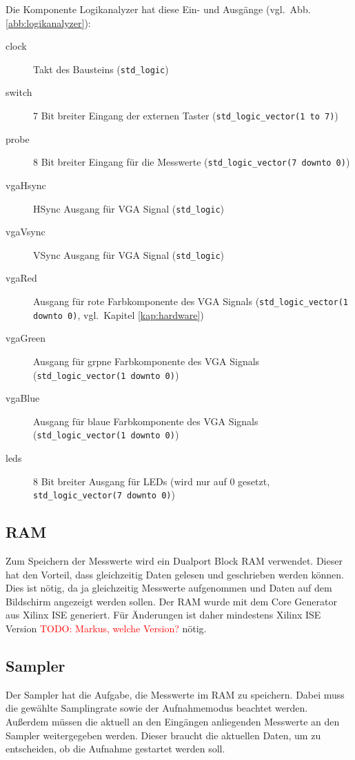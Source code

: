 \documentclass[IN,ngerman,utf8,12pt]{tumbook}
\newcommand\todo[1]{\textcolor{red}{TODO: #1}}
\newcommand{\vgl}{vgl.\ }
\begin{document}
Die Komponente Logikanalyzer hat diese Ein- und Ausgänge (\vgl Abb. \ref{abb:logikanalyzer}):
\begin{description}
    \item[clock] Takt des Bausteins (\texttt{std\_logic})
    \item[switch] 7 Bit breiter Eingang der externen Taster (\texttt{std\_logic\_vector(1 to 7)})
    \item[probe] 8 Bit breiter Eingang für die Messwerte (\texttt{std\_logic\_vector(7 downto 0)})
    \item[vgaHsync] HSync Ausgang für VGA Signal (\texttt{std\_logic})
    \item[vgaVsync] VSync Ausgang für VGA Signal (\texttt{std\_logic})
    \item[vgaRed] Ausgang für rote Farbkomponente des VGA Signals (\texttt{std\_logic\_vector(1 downto 0)}, \vgl Kapitel \ref{kap:hardware})
    \item[vgaGreen] Ausgang für grpne Farbkomponente des VGA Signals (\texttt{std\_logic\_vector(1 downto 0)})
    \item[vgaBlue] Ausgang für blaue Farbkomponente des VGA Signals (\texttt{std\_logic\_vector(1 downto 0)})
    \item[leds] 8 Bit breiter Ausgang für LEDs (wird nur auf 0 gesetzt, \texttt{std\_logic\_vector(7 downto 0)})
\end{description}

\subsection{RAM}

Zum Speichern der Messwerte wird ein Dualport Block RAM verwendet.
Dieser hat den Vorteil, dass gleichzeitig Daten gelesen und geschrieben werden können.
Dies ist nötig, da ja gleichzeitig Messwerte aufgenommen und Daten auf dem Bildschirm angezeigt werden sollen.
Der RAM wurde mit dem Core Generator aus Xilinx ISE generiert.
Für Änderungen ist daher mindestens Xilinx ISE Version \todo{Markus, welche Version?} nötig.

\subsection{Sampler}

Der Sampler hat die Aufgabe, die Messwerte im RAM zu speichern.
Dabei muss die gewählte Samplingrate sowie der Aufnahmemodus beachtet werden.
Außerdem müssen die aktuell an den Eingängen anliegenden Messwerte an den Sampler weitergegeben werden.
Dieser braucht die aktuellen Daten, um zu entscheiden, ob die Aufnahme gestartet werden soll.
\end{document}

